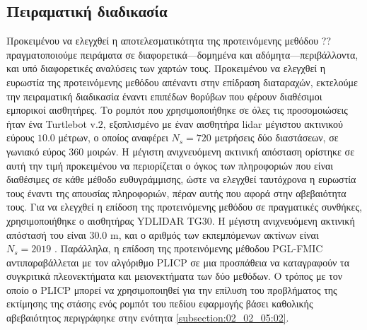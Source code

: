 \subsection{Πειραματική διαδικασία}
\label{subsection:02_03_04:01}


Προκειμένου να ελεγχθεί η αποτελεσματικότητα της προτεινόμενης μεθόδου ??
πραγματοποιούμε πειράματα σε διαφορετικά---δομημένα και αδόμητα---περιβάλλοντα,
και υπό διαφορετικές αναλύσεις των χαρτών τους. Προκειμένου να ελεγχθεί η
ευρωστία της προτεινόμενης μεθόδου απέναντι στην επίδραση διαταραχών, εκτελούμε
την πειραματική διαδικασία έναντι επιπέδων θορύβων που φέρουν διαθέσιμοι
εμπορικοί αισθητήρες. Το ρομπότ που χρησιμοποιήθηκε σε όλες τις προσομοιώσεις
ήταν ένα Turtlebot v.$2$, εξοπλισμένο με έναν αισθητήρα lidar μέγιστου
ακτινικού εύρους $10.0$ μέτρων, ο οποίος αναφέρει $N_s=720$ μετρήσεις δύο
διαστάσεων, σε γωνιακό εύρος $360$ μοιρών. Η μέγιστη ανιχνευόμενη ακτινική
απόσταση ορίστηκε σε αυτή την τιμή προκειμένου να περιορίζεται ο όγκος των
πληροφοριών που είναι διαθέσιμες σε κάθε μέθοδο ευθυγράμμισης, ώστε να ελεγχθεί
ταυτόχρονα η ευρωστία τους έναντι της απουσίας πληροφοριών, πέραν αυτής που
αφορά στην αβεβαιότητα τους.  Για να ελεγχθεί η επίδοση της προτεινόμενης
μεθόδου σε πραγματικές συνθήκες, χρησιμοποιήθηκε ο αισθητήρας YDLIDAR TG30. Η
μέγιστη ανιχνευόμενη ακτινική απόστασή του είναι $30.0$ m, και ο αριθμός των
εκπεμπόμενων ακτίνων είναι $N_s = 2019$ \cite{ydlidar}. Παράλληλα, η επίδοση της
προτεινόμενης μέθοδου PGL-FMIC αντιπαραβάλλεται με τον αλγόριθμο PLICP σε μια
προσπάθεια να καταγραφούν τα συγκριτικά πλεονεκτήματα και μειονεκτήματα των δύο
μεθόδων. Ο τρόπος με τον οποίο ο PLICP μπορεί να χρησιμοποιηθεί για την επίλυση
του προβλήματος της εκτίμησης της στάσης ενός ρομπότ του πεδίου εφαρμογής βάσει
καθολικής αβεβαιότητος περιγράφηκε στην ενότητα \ref{subsection:02_02_05:02}.

